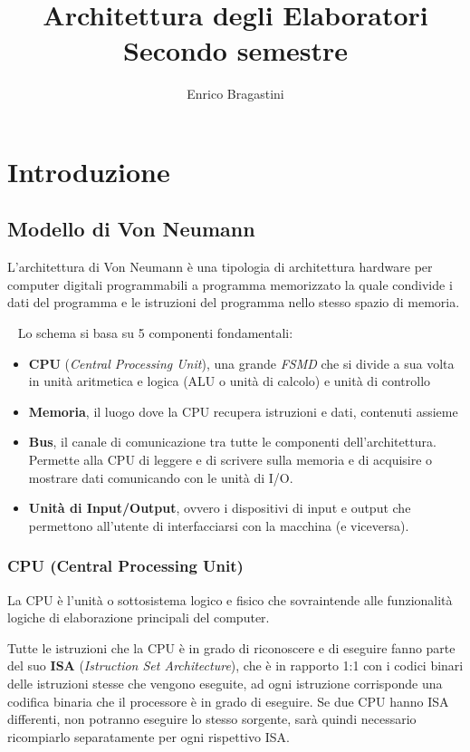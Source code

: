 \documentclass[a4paper,11pt,oneside]{book}
\title{\Large{\textbf{Architettura degli Elaboratori}} \\ Secondo semestre}
\author{Enrico Bragastini}
\date{}
\begin{document}
\pagestyle{fancy}
\fancyhf{}
\rhead{}
\lhead{\nouppercase\leftmark}
\cfoot{\thepage}
\frontmatter

\maketitle
\tableofcontents

\mainmatter
\chapter{Introduzione}
\section{Modello di Von Neumann}
L'architettura di Von Neumann è una tipologia di architettura hardware per computer digitali programmabili
a programma memorizzato la quale condivide i dati del programma e le istruzioni del programma nello stesso spazio di memoria.

~\newline
Lo schema si basa su 5 componenti fondamentali:
\begin{itemize}
    \item \textbf{CPU} (\emph{Central Processing Unit}), una grande \emph{FSMD} che si divide a sua volta in unità aritmetica
          e logica (ALU o unità di calcolo) e unità di controllo
    \item \textbf{Memoria}, il luogo dove la CPU recupera istruzioni e dati, contenuti assieme
    \item \textbf{Bus}, il canale di comunicazione tra tutte le componenti dell'architettura. Permette alla CPU di leggere e di scrivere sulla memoria e
          di acquisire o mostrare dati comunicando con le unità di I/O.
    \item \textbf{Unità di Input/Output}, ovvero i dispositivi di input e output che permettono all'utente di interfacciarsi con la macchina (e viceversa).
\end{itemize}

\subsection{CPU (Central Processing Unit)}
La CPU è l'unità o sottosistema logico e fisico che sovraintende alle funzionalità logiche di elaborazione principali del computer.

Tutte le istruzioni che la CPU è in grado di riconoscere e di eseguire fanno parte del suo \textbf{ISA} (\emph{Istruction Set Architecture}), che è in
rapporto 1:1 con i codici binari delle istruzioni stesse che vengono eseguite, ad ogni istruzione corrisponde una codifica binaria che il processore
è in grado di eseguire. Se due CPU hanno ISA differenti, non potranno eseguire lo stesso sorgente, sarà quindi necessario ricompiarlo separatamente per ogni rispettivo ISA.
\end{document}
